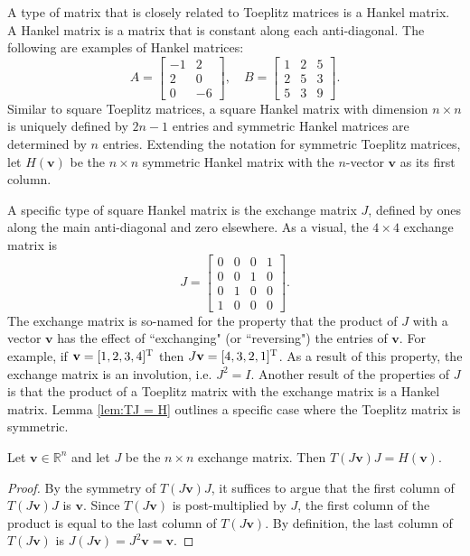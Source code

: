 A type of matrix that is closely related to Toeplitz matrices is a Hankel matrix. A Hankel matrix is a matrix that is constant along each anti-diagonal. The following are examples of Hankel matrices:
\[A = \begin{bmatrix}
-1 & 2 \\
2 & 0 \\
0 & -6
\end{bmatrix}, \quad 
B = \begin{bmatrix}
1 & 2 & 5 \\
2 & 5 & 3 \\
5 & 3 & 9
\end{bmatrix}.\]
Similar to square Toeplitz matrices, a square Hankel matrix with dimension $n \times n$ is uniquely defined by $2n -1$ entries and symmetric Hankel matrices are determined by $n$ entries. Extending the notation for symmetric Toeplitz matrices, let $H(\mathbf{v})$ be the $n \times n$ symmetric Hankel matrix with the $n$-vector $\mathbf{v}$ as its first column. \par
A specific type of square Hankel matrix is the exchange matrix $J$, defined by ones along the main anti-diagonal and zero elsewhere. As a visual, the $4 \times 4$ exchange matrix is
\[J = \begin{bmatrix}
0 & 0 & 0 & 1 \\
0 & 0 & 1 & 0 \\
0 & 1 & 0 & 0 \\
1 & 0  & 0 & 0
\end{bmatrix}.\]
The exchange matrix is so-named for the property that the product of $J$ with a vector $\mathbf{v}$ has the effect of ``exchanging" (or ``reversing") the entries of $\mathbf{v}$. For example, if $\mathbf{v} = [1,2,3,4]^{\mathrm{T}}$ then $J\mathbf{v} = [4,3,2,1]^{\mathrm{T}}$. As a result of this property, the exchange matrix is an involution, i.e. $J^2 = I$. Another result of the properties of $J$ is that the product of a Toeplitz matrix with the exchange matrix is a Hankel matrix. Lemma \ref{lem:TJ = H} outlines a specific case where the Toeplitz matrix is symmetric.
\begin{lemma}
\label{lem:TJ = H}
Let $\mathbf{v} \in \mathbb{R}^n$ and let $J$ be the $n \times n$ exchange matrix. Then $T(J\mathbf{v})J = H(\mathbf{v})$.
\end{lemma}
\begin{proof}
By the symmetry of $T(J\mathbf{v})J$, it suffices to argue that the first column of $T(J\mathbf{v})J$ is $\mathbf{v}$. Since $T(J\mathbf{v})$ is post-multiplied by $J$, the first column of the product is equal to the last column of $T(J\mathbf{v})$. By definition, the last column of $T(J\mathbf{v})$ is $J(J\mathbf{v}) = J^2\mathbf{v} = \mathbf{v}$.
\end{proof}
